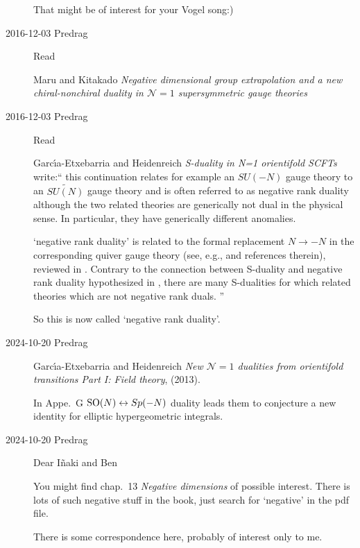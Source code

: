 \begin{description}
That might be of interest for your Vogel song:)

\item[2016-12-03 Predrag]
Read

Maru and Kitakado
{\em Negative dimensional group extrapolation and a new chiral-nonchiral
duality in ${\mathcal N} = 1$ supersymmetric gauge theories}

\item[2016-12-03 Predrag]
Read

{Garc{\'{\i}}a-Etxebarria} 
    and 
{Heidenreich}
{\em S-duality in N=1 orientifold {SCFTs}} write:``
this continuation relates for example an $SU(-N)$ gauge theory to an
$\tilde{SU(N)}$ gauge theory and is often referred to as negative rank duality
although the two related theories are generically not dual in the physical
sense. In particular, they have generically different anomalies.

`negative rank duality' is related to the formal replacement $N \to -N$ in the
corresponding quiver gauge theory (see, e.g.,  and references
therein), reviewed in . Contrary to the connection between
S-duality and negative rank duality hypothesized in ,
there are many S-dualities for which related theories which are not negative
rank duals.
''

So this is now called `negative rank duality'.

\item[2024-10-20 Predrag]
{Garc{\'{\i}}a-Etxebarria} and Heidenreich
    {{\em New {$\mathcal{N}=1$} dualities from orientifold transitions {Part I: Field} theory}},
(2013).

In Appe.~G $\textrm{SO}(N) \leftrightarrow Sp(-N)$ duality leads them to conjecture
a new identity for elliptic hypergeometric integrals.

\item[2024-10-20 Predrag]
Dear I{\~{n}}aki
    and 
Ben %

You might find  {chap.~13} 
{\em Negative dimensions} of possible interest. There is lots of such negative 
stuff in the book, just search for `negative' in the pdf file.

There is some correspondence 
{here}, probably of interest only to me.



\end{description}

